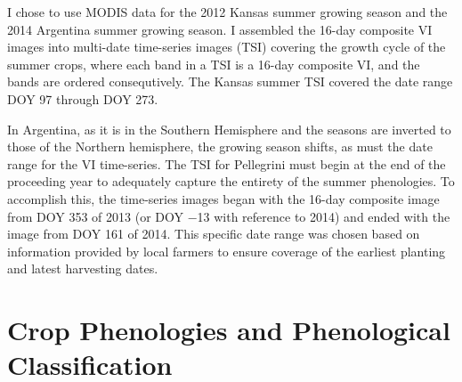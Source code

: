 I chose to use MODIS data for the 2012 Kansas summer growing season and the 2014 Argentina summer growing season. I assembled the 16-day composite VI images into multi-date time-series images (TSI) covering the growth cycle of the summer crops, where each band in a TSI is a 16-day composite VI, and the bands are ordered consequtively. The Kansas summer TSI covered the date range DOY 97 through DOY 273.

In Argentina, as it is in the Southern Hemisphere and the seasons are inverted to those of the Northern hemisphere, the growing season shifts, as must the date range for the VI time-series. The TSI for Pellegrini must begin at the end of the proceeding year to adequately capture the entirety of the summer phenologies. To accomplish this, the time-series images began with the 16-day composite image from DOY 353 of 2013 (or DOY −13 with reference to 2014) and ended with the image from DOY 161 of 2014. This specific date range was chosen based on information provided by local farmers to ensure coverage of the earliest planting and latest harvesting dates.

\section{Crop Phenologies and Phenological Classification}

